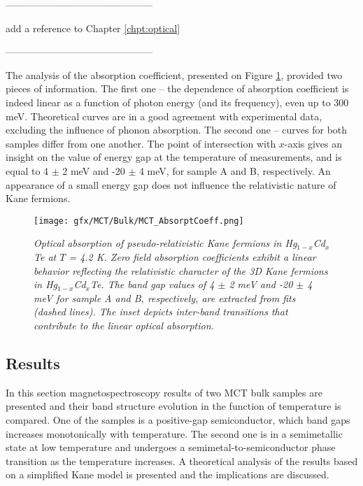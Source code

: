 \documentclass[titlepage,a4paper]{book}
\newcommand{\wciecie}{\quad\phantom{v}}
\begin{document}
---------------------------------------------

add a reference to Chapter \ref{chpt:optical}

---------------------------------------------

The analysis of the absorption coefficient, presented on Figure \ref{fig:Samples_MCT_AbsorptCoeff}, provided two pieces of information. The first one -- the dependence of absorption coefficient is indeed linear as a function of photon energy (and its frequency), even up to 300 meV. Theoretical curves are in a good agreement with experimental data, excluding the influence of phonon absorption. The second one -- curves for both samples differ from one another. The point of intersection with $x$-axis gives an insight on the value of energy gap at the temperature of measurements, and is equal to 4 $\pm$ 2 meV and -20 $\pm$ 4 meV, for sample A and B, respectively. An appearance of a small energy gap does not influence the relativistic nature of Kane fermions.   

\begin{figure}[H]
	\centering
	\texttt{[image: gfx/MCT/Bulk/MCT\_AbsorptCoeff.png]}
	\vspace{-10pt}
	\caption{\textit{Optical absorption of pseudo-relativistic Kane fermions in Hg$_{1-x}$Cd$_x$Te at $T$ = 4.2 K. Zero field absorption coefficients exhibit a linear behavior reflecting the relativistic character of the 3D Kane fermions in Hg$_{1-x}$Cd$_x$Te. The band gap values of 4 $\pm$ 2 meV and -20 $\pm$ 4 meV for sample A and B, respectively, are extracted from fits (dashed lines). The inset depicts inter-band transitions that contribute to the linear optical absorption.}}	\label{fig:Samples_MCT_AbsorptCoeff}
\end{figure} 

\subsection{Results}
\label{sec:MCT_bulk}
\wciecie
In this section magnetospectroscopy results of two MCT bulk samples are presented and their band structure evolution in the function of temperature is compared. One of the samples is a positive-gap semiconductor, which band gaps increases monotonically with temperature. The second one is in a semimetallic state at low temperature and undergoes a semimetal-to-semiconductor phase transition as the temperature increases. A theoretical analysis of the results based on a simplified Kane model is presented and the implications are discussed.
\end{document}
